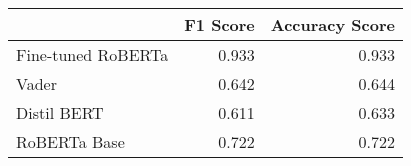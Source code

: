 \begin{tabular}{lrr}
\toprule
{} &  F1 Score &  Accuracy Score \\
\midrule
Fine-tuned RoBERTa &     0.933 &           0.933 \\
Vader              &     0.642 &           0.644 \\
Distil BERT        &     0.611 &           0.633 \\
RoBERTa Base       &     0.722 &           0.722 \\
\bottomrule
\end{tabular}
